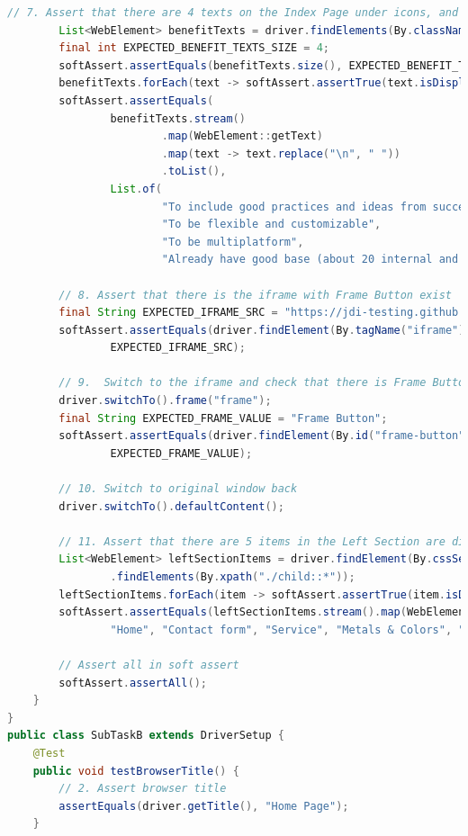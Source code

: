 \documentclass[a4paper]{article}
\begin{document}
\begin{lstlisting}[language=Java]
        // 7. Assert that there are 4 texts on the Index Page under icons, and they have proper text
        List<WebElement> benefitTexts = driver.findElements(By.className("benefit-txt"));
        final int EXPECTED_BENEFIT_TEXTS_SIZE = 4;
        softAssert.assertEquals(benefitTexts.size(), EXPECTED_BENEFIT_TEXTS_SIZE);
        benefitTexts.forEach(text -> softAssert.assertTrue(text.isDisplayed()));
        softAssert.assertEquals(
                benefitTexts.stream()
                        .map(WebElement::getText)
                        .map(text -> text.replace("\n", " "))
                        .toList(),
                List.of(
                        "To include good practices and ideas from successful EPAM project",
                        "To be flexible and customizable",
                        "To be multiplatform",
                        "Already have good base (about 20 internal and some external projects), wish to get more..."));

        // 8. Assert that there is the iframe with Frame Button exist
        final String EXPECTED_IFRAME_SRC = "https://jdi-testing.github.io/jdi-light/frame-button.html";
        softAssert.assertEquals(driver.findElement(By.tagName("iframe")).getAttribute("src"),
                EXPECTED_IFRAME_SRC);

        // 9.  Switch to the iframe and check that there is Frame Button in the iframe
        driver.switchTo().frame("frame");
        final String EXPECTED_FRAME_VALUE = "Frame Button";
        softAssert.assertEquals(driver.findElement(By.id("frame-button")).getAttribute("value"),
                EXPECTED_FRAME_VALUE);

        // 10. Switch to original window back
        driver.switchTo().defaultContent();

        // 11. Assert that there are 5 items in the Left Section are displayed, and they have proper text
        List<WebElement> leftSectionItems = driver.findElement(By.cssSelector("ul.sidebar-menu.left"))
                .findElements(By.xpath("./child::*"));
        leftSectionItems.forEach(item -> softAssert.assertTrue(item.isDisplayed()));
        softAssert.assertEquals(leftSectionItems.stream().map(WebElement::getText).toList(), List.of(
                "Home", "Contact form", "Service", "Metals & Colors", "Elements packs"));

        // Assert all in soft assert
        softAssert.assertAll();
    }
}
public class SubTaskB extends DriverSetup {
    @Test
    public void testBrowserTitle() {
        // 2. Assert browser title
        assertEquals(driver.getTitle(), "Home Page");
    }


\end{lstlisting}
\end{document}
